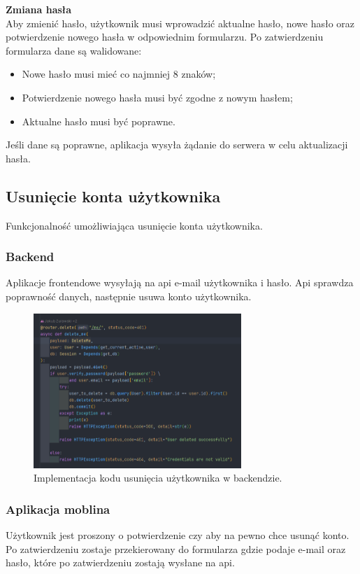 \textbf{Zmiana hasła}\\
Aby zmienić hasło, użytkownik musi wprowadzić aktualne hasło, nowe hasło oraz potwierdzenie nowego hasła w odpowiednim formularzu. Po zatwierdzeniu formularza dane są walidowane:
\begin{itemize}
    \item Nowe hasło musi mieć co najmniej 8 znaków;
    \item Potwierdzenie nowego hasła musi być zgodne z nowym hasłem;
    \item Aktualne hasło musi być poprawne.
\end{itemize}
Jeśli dane są poprawne, aplikacja wysyła żądanie do serwera w celu aktualizacji hasła.

\subsection{Usunięcie konta użytkownika}
Funkcjonalność umożliwiająca usunięcie konta użytkownika.

\subsubsection{Backend}
Aplikacje frontendowe wysyłają na api e-mail użytkownika i hasło. Api sprawdza poprawność danych, następnie usuwa konto użytkownika.

\begin{figure}[H]
    \centering
    \includegraphics[width=0.7\textwidth]{chapters/chapter_8/screens/delete_user_backend}
    \caption{Implementacja kodu usunięcia użytkownika w backendzie.}
    \label{img:delete_user_backend}
\end{figure}

\subsubsection{Aplikacja moblina}
Użytkownik jest proszony o potwierdzenie czy aby na pewno chce usunąć konto. Po zatwierdzeniu zostaje przekierowany do formularza gdzie podaje e-mail oraz hasło, które po zatwierdzeniu zostają wysłane na api.

